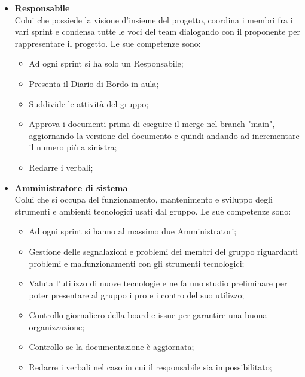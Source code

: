             \begin{itemize}
                \item \textbf{Responsabile}\\
                Colui che possiede la visione d'insieme del progetto, coordina i membri fra i vari sprint e condensa tutte le voci del team
                dialogando con il proponente per rappresentare il progetto.
                Le sue competenze sono:
                \begin{itemize}
                    \item Ad ogni sprint si ha solo un Responsabile;
                    \item Presenta il Diario di Bordo in aula;
                    \item Suddivide le attività del gruppo;
                    \item Approva i documenti prima di eseguire il merge nel branch "main", aggiornando la versione del documento e quindi andando ad incrementare il numero più a sinistra;
                    \item Redarre i verbali;
                \end{itemize}
                \item \textbf{Amministratore di sistema}\\
                Colui che si occupa del funzionamento, mantenimento e sviluppo degli strumenti e ambienti tecnologici
                usati dal gruppo.
                Le sue competenze sono:
                \begin{itemize}
                    \item Ad ogni sprint si hanno al massimo due Amministratori;
                    \item Gestione delle segnalazioni e problemi dei membri del gruppo riguardanti problemi e malfunzionamenti
                    con gli strumenti tecnologici;
                    \item Valuta l'utilizzo di nuove tecnologie e ne fa uno studio preliminare per poter presentare al
                        gruppo i pro e i contro del suo utilizzo;
                    \item Controllo giornaliero della board e issue per garantire una buona organizzazione;
                    \item Controllo se la documentazione è aggiornata;
                    \item Redarre i verbali nel caso in cui il responsabile sia impossibilitato;
                    \end{itemize}

\end{itemize}
